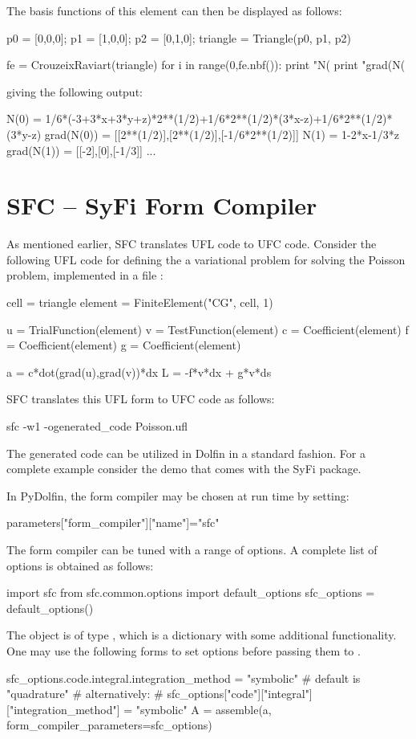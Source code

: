 The basis functions of this element can then be displayed as follows: 
\begin{code}
p0 = [0,0,0]; p1 = [1,0,0]; p2 = [0,1,0]; 
triangle = Triangle(p0, p1, p2) 

fe = CrouzeixRaviart(triangle)
for i in range(0,fe.nbf()): 
  print "N(%
  print "grad(N(%
\end{code}
giving the following output: 
\begin{code}
N(0)       =  1/6*(-3+3*x+3*y+z)*2**(1/2)+1/6*2**(1/2)*(3*x-z)+1/6*2**(1/2)*(3*y-z)
grad(N(0)) =  [[2**(1/2)],[2**(1/2)],[-1/6*2**(1/2)]]
N(1)       =  1-2*x-1/3*z
grad(N(1)) =  [[-2],[0],[-1/3]]
...
\end{code}



\section{SFC -- SyFi Form Compiler}

As mentioned earlier, SFC translates UFL code to UFC code. Consider the 
following UFL code for defining the a variational problem for solving
the Poisson problem, implemented in a file :
\begin{code}
cell = triangle
element = FiniteElement("CG", cell, 1)

u = TrialFunction(element)
v = TestFunction(element)
c = Coefficient(element)
f = Coefficient(element)
g = Coefficient(element)

a = c*dot(grad(u),grad(v))*dx
L = -f*v*dx + g*v*ds
\end{code}
SFC translates this UFL form to UFC code as follows: 
\begin{code}
sfc -w1  -ogenerated_code Poisson.ufl
\end{code}
The generated code can be utilized in Dolfin in a standard fashion. 
For a complete example consider the demo  that
comes with the SyFi package. 

In PyDolfin, the form compiler may be chosen at run time by setting:  
\begin{code}
  parameters["form_compiler"]["name"]="sfc"
\end{code}
The form compiler can be tuned with a range of options. A complete list of options is obtained as follows:  
\begin{code}
import sfc 
from sfc.common.options import default_options
sfc_options = default_options()
\end{code}
The object  is of type , which is a dictionary with some 
additional functionality. One may use the following forms to set options before passing them to .  
\begin{code}
sfc_options.code.integral.integration_method = "symbolic" # default is "quadrature"  
# alternatively:  
# sfc_options["code"]["integral"]["integration_method"] = "symbolic"  
A = assemble(a, form_compiler_parameters=sfc_options)
\end{code}

